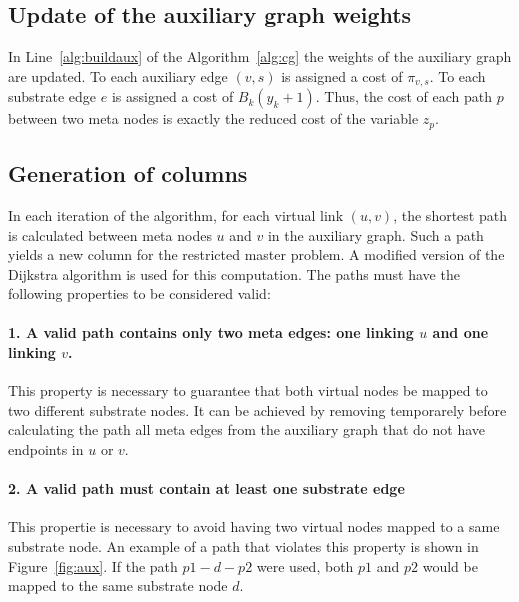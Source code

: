 \documentclass{llncs}
\begin{document}
\subsection{Update of the auxiliary graph weights}\label{sec:update}
In Line~\ref{alg:buildaux} of the Algorithm~\ref{alg:cg} the weights of the auxiliary graph are updated.
To each auxiliary edge $(v,s)$ is assigned a cost of $\pi_{v,s}$. 
To each substrate edge $e$ is assigned a cost of $B_{k}(y_{k} + 1)$. 
Thus, the cost of each path $p$ between two meta nodes is exactly the reduced cost of the variable $z_{p}$.


\subsection{Generation of columns}
In each iteration of the algorithm, for each virtual link $(u,v)$, the shortest path is calculated between meta nodes $u$ and $v$ in the auxiliary graph.
Such a path yields a new column for the restricted master problem. 
A modified version of the Dijkstra algorithm is used for this computation. 
The paths must have the following properties to be considered valid:

\paragraph{1. A valid path contains only two meta edges: one linking $u$ and one linking $v$.}
This property is necessary to guarantee that both virtual nodes be mapped to two different substrate nodes. 
It can be achieved by removing temporarely before calculating the path all meta edges from the auxiliary graph that do not have endpoints in $u$ or $v$. 

\paragraph{2. A valid path must contain at least one substrate edge}
This propertie is necessary to avoid having two virtual nodes mapped to a same substrate node.
An example of a path that violates this property is shown in Figure~\ref{fig:aux}. 
If the path $p1-d-p2$ were used, both $p1$ and $p2$ would be mapped to the same substrate node $d$. 
\end{document}
